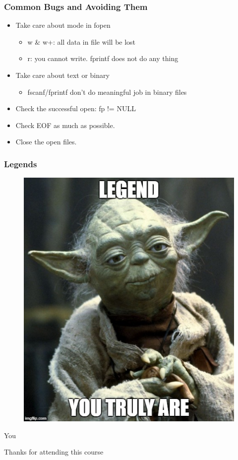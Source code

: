 \documentclass{../c-lecture}
\begin{document}
\begin{frame}
  \frametitle{Common Bugs and Avoiding Them}
  \begin{itemize}
    \item Take care about mode in fopen
    \begin{itemize}
      \item w \& w+: all data in file will be lost
      \item r: you cannot write. fprintf does not do any thing
    \end{itemize}
    \item Take care about text or binary
    \begin{itemize}
      \item fscanf/fprintf don’t do meaningful job in binary files
    \end{itemize}
    \item Check the successful open: fp != NULL
    \item Check EOF as much as possible.
    \item Close the open files.
  \end{itemize}
\end{frame}

\begin{frame}
  \frametitle{Legends}
  \begin{figure}
    \includegraphics[height=.75\textheight]{./img/yoda.jpg}
  \end{figure}
  \pause%
  \centering
  \color{Violet} You
\end{frame}
\begin{frame}
  \centering
  \huge Thanks for attending this course
\end{frame}
\end{document}

